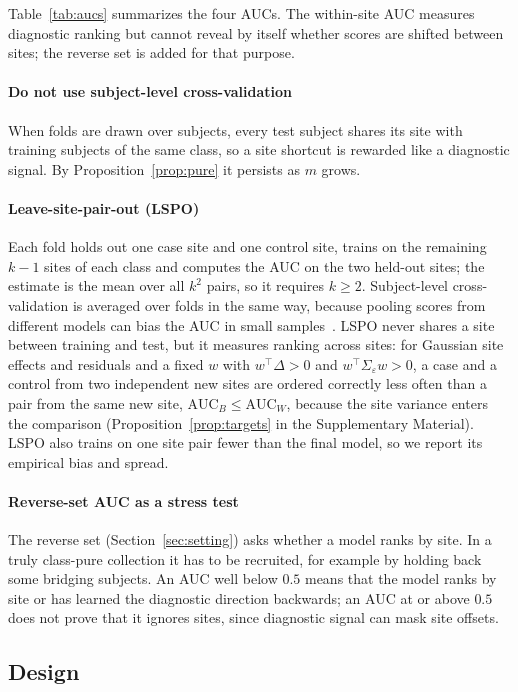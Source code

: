 Table~\ref{tab:aucs} summarizes the four AUCs. The within-site AUC measures diagnostic ranking but cannot reveal by itself whether scores are shifted between sites; the reverse set is added for that purpose.

\paragraph{Do not use subject-level cross-validation} When folds are drawn over subjects, every test subject shares its site with training subjects of the same class, so a site shortcut is rewarded like a diagnostic signal. By Proposition~\ref{prop:pure} it persists as $m$ grows.

\paragraph{Leave-site-pair-out (LSPO)} Each fold holds out one case site and one control site, trains on the remaining $k-1$ sites of each class and computes the AUC on the two held-out sites; the estimate is the mean over all $k^2$ pairs, so it requires $k\ge2$. Subject-level cross-validation is averaged over folds in the same way, because pooling scores from different models can bias the AUC in small samples~\cite{airola2011}. LSPO never shares a site between training and test, but it measures ranking across sites: for Gaussian site effects and residuals and a fixed $w$ with $w^\top\Delta>0$ and $w^\top\Sigma_\varepsilon w>0$, a case and a control from two independent new sites are ordered correctly less often than a pair from the same new site, $\mathrm{AUC}_B\le\mathrm{AUC}_W$, because the site variance enters the comparison (Proposition~\ref{prop:targets} in the Supplementary Material). LSPO also trains on one site pair fewer than the final model, so we report its empirical bias and spread.

\paragraph{Reverse-set AUC as a stress test} The reverse set (Section~\ref{sec:setting}) asks whether a model ranks by site. In a truly class-pure collection it has to be recruited, for example by holding back some bridging subjects. An AUC well below $0.5$ means that the model ranks by site or has learned the diagnostic direction backwards; an AUC at or above $0.5$ does not prove that it ignores sites, since diagnostic signal can mask site offsets.

\subsection{Design}\label{sec:design}

